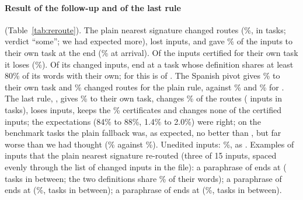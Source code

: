\paragraph{Result of the follow-up and of the last rule} (Table~\ref{tab:reroute}). The plain nearest signature changed \RerouteSigNChanged{} routes (\RerouteSigChanged{}\%, in \RerouteSigTasks{} tasks; verdict ``some''; we had expected more), lost
\RerouteSigNLost{} inputs, and gave \RerouteSigOwnEnd{}\% of the inputs to their own task at the end (\RerouteSigOwnStart{}\% at arrival). Of the \RerouteCertOwn{} inputs certified for their own task it loses \RerouteSigLostOfCert{}
(\RerouteSigLostOfCertPct{}\%). Of its \RerouteSigNChanged{} changed inputs, \RerouteSigToSibling{} end at a task whose definition shares at least 80\% of its words with their own; for \nearest{} this is \RerouteNearToSibling{} of \RerouteNearNChanged{}. The Spanish pivot gives
\RerouteSigEsOwn{}\% to their own task and \RerouteSigEsChanged{}\% changed routes for the plain rule, against \RerouteCertEsOwn{}\% and \RerouteCertEsChanged{}\% for \cert{}. The last rule, \hybrid{}, gives \RerouteHybOwnEnd{}\% to their own task, changes \RerouteHybChanged{}\% of the routes
(\RerouteHybNChanged{} inputs in \RerouteHybTasks{} tasks), loses \RerouteHybNLost{} inputs, keeps the \RerouteHybInZone{}\% certificates and changes none of the certified inputs; the expectations (84\% to 88\%, 1.4\% to 2.0\%) were right; on the benchmark tasks the plain fallback was, as expected, no better than \cert{}, but far worse than we had thought (\RerouteSigBenchFiveHeavyOwn{}\% against \RerouteCertBenchFiveHeavyOwn{}\%). Unedited inputs: \RerouteHybUnOwn{}\%, as \cert{}.
Examples of inputs that the plain nearest signature re-routed (three of 15 inputs, spaced evenly through the list of changed inputs in the file): a \RerouteExOnePivot{} paraphrase of \texttt{\RerouteExOneTask{}} ends at \texttt{\RerouteExOneEnd{}} (\RerouteExOneBetween{} tasks in between; the two definitions share \RerouteExOneShare{}\% of their words); a \RerouteExTwoPivot{} paraphrase of
\texttt{\RerouteExTwoTask{}} ends at \texttt{\RerouteExTwoEnd{}} (\RerouteExTwoShare{}\%, \RerouteExTwoBetween{} tasks in between); a \RerouteExThreePivot{} paraphrase of \texttt{\RerouteExThreeTask{}} ends at \texttt{\RerouteExThreeEnd{}} (\RerouteExThreeShare{}\%, \RerouteExThreeBetween{} tasks in between).

